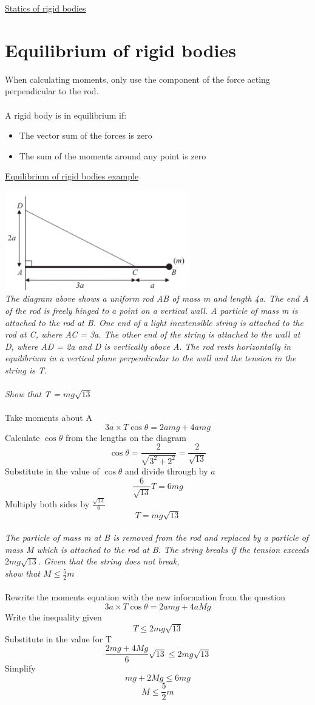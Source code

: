 \documentclass{article}[18pt]
\begin{document}
\begin{center}
\underline{\huge Statics of rigid bodies}
\end{center}
\section{Equilibrium of rigid bodies}
When calculating moments, only use the component of the force acting perpendicular to the rod.\\
\\
A rigid body is in equilibrium if:
\begin{itemize}
\item The vector sum of the forces is zero
\item The sum of the moments around any point is zero
\end{itemize}
\newpage
\begin{center}
\underline{\Huge Equilibrium of rigid bodies example}
\end{center}
\includegraphics[width=8cm]{eq_rigid.png}\\
\textit{The diagram above shows a uniform rod AB of mass m and length 4a. The end A of the rod is
freely hinged to a point on a vertical wall. A particle of mass m is attached to the rod at B. One
end of a light inextensible string is attached to the rod at C, where AC = 3a. The other end of the
string is attached to the wall at D, where AD = 2a and D is vertically above A. The rod rests
horizontally in equilibrium in a vertical plane perpendicular to the wall and the tension in the
string is T. }\\
\\
\textit{Show that T = $mg\sqrt{13}$}\\
\\
Take moments about A 
$$3a\times T\cos\theta=2amg+4amg$$
Calculate $\cos\theta$ from the lengths on the diagram
$$\cos\theta=\frac{2}{\sqrt{3^2+2^2}}=\frac{2}{\sqrt{13}}$$
Substitute in the value of $\cos\theta$ and divide through by $a$
$$\frac{6}{\sqrt{13}}T=6mg$$
Multiply both sides by $\frac{\sqrt{13}}{6}$
$$T=mg\sqrt{13}$$
\\
\textit{The particle of mass m at B is removed from the rod and replaced by a particle of mass M which
is attached to the rod at B. The string breaks if the tension exceeds $2mg\sqrt{13}$. Given that the
string does not break,\\
show that $M\leqslant\frac{5}{2}m$}\\
\\
Rewrite the moments equation with the new information from the question
$$3a\times T\cos\theta=2amg+4aMg$$
Write the inequality given
$$T\leqslant 2mg\sqrt{13}$$
Substitute in the value for T
$$\frac{2mg+4Mg}{6}\sqrt{13}\leqslant2mg\sqrt{13}$$
Simplify
$$mg+2Mg\leqslant 6mg$$
$$M\leqslant\frac{5}{2}m$$
\end{document}
